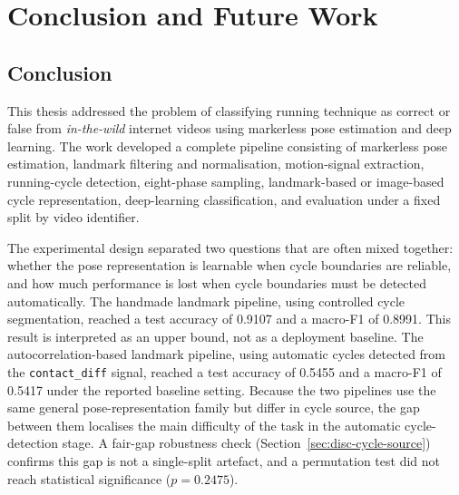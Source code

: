 %

\chapter{Conclusion and Future Work}
\label{ch:conclusion}

\section{Conclusion}
\label{sec:concl-summary}

This thesis addressed the problem of classifying running technique as correct or
false from \emph{in-the-wild} internet videos using markerless pose estimation
and deep learning. The work developed a complete pipeline consisting of
markerless pose estimation, landmark filtering and normalisation, motion-signal
extraction, running-cycle detection, eight-phase sampling, landmark-based or
image-based cycle representation, deep-learning classification, and evaluation
under a fixed split by video identifier.

The experimental design separated two questions that are often mixed together:
whether the pose representation is learnable when cycle boundaries are reliable,
and how much performance is lost when cycle boundaries must be detected
automatically. The handmade landmark pipeline, using controlled cycle
segmentation, reached a test accuracy of 0.9107 and a macro-F1 of 0.8991. This
result is interpreted as an upper bound, not as a deployment baseline. The
autocorrelation-based landmark pipeline, using automatic cycles detected from
the \texttt{contact\_diff} signal, reached a test accuracy of 0.5455 and a
macro-F1 of 0.5417 under the reported baseline setting. Because the two
pipelines use the same general pose-representation family but differ in cycle
source, the gap between them localises the main difficulty of the task in the
automatic cycle-detection stage. A fair-gap robustness check (Section~\ref{sec:disc-cycle-source}) confirms this gap is not a single-split artefact, and a permutation test did not reach statistical significance ($p = 0.2475$).

